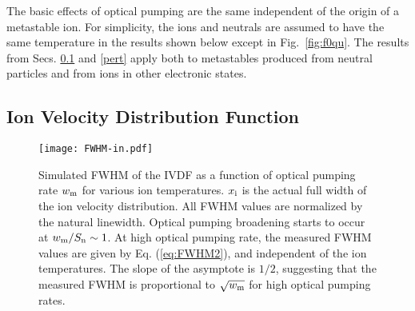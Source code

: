 \documentclass[aip,pop,reprint]{revtex4-1}
\begin{document}


The basic effects of optical pumping are the same independent of the origin of a metastable ion. For simplicity, the ions and neutrals are assumed to have the same temperature in the results shown below except in Fig.~\ref{fig:f0qu}. The results from Secs. \ref{IVDF} and \ref{pert} apply both to metastables produced from neutral particles and from ions in other electronic states.

\subsection{Ion Velocity Distribution Function}
\label{IVDF}

\begin{figure}
\begin{center}
\texttt{[image: FWHM-in.pdf]}
\caption{Simulated FWHM of the IVDF as a function of optical pumping rate $w_\textup{m}$ for various ion temperatures. $x_\textup{i}$ is the actual full width of the ion velocity distribution. All FWHM values are normalized by the natural linewidth. Optical pumping broadening starts to occur at $w_\textup{m}/S_\textup{n}\sim 1$. At high optical pumping rate, the measured FWHM values are given by Eq. (\ref{eq:FWHM2}), and independent of the ion temperatures. The slope of the asymptote is $1/2$, suggesting that the measured FWHM is proportional to $\sqrt{w_\textup{m}}$ for high optical pumping rates.}
\label{fig:FWHM-in}
\end{center}
\end{figure}
\end{document}
